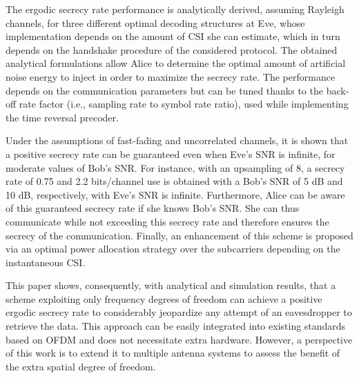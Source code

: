 \documentclass[journal,comsoc]{IEEEtran}
\begin{document}
The ergodic secrecy rate performance is analytically derived, assuming Rayleigh channels, for three different optimal decoding structures at Eve, whose implementation depends on the amount of CSI she can estimate, which in turn depends on the handshake procedure of the considered protocol. The obtained analytical formulations allow Alice to determine the optimal amount of artificial noise energy to inject in order to maximize the secrecy rate. The performance depends on the communication parameters but can be tuned thanks to the back-off rate factor (i.e., sampling rate to symbol rate ratio), used while implementing the time reversal precoder.


Under the assumptions of fast-fading and uncorrelated channels, it is shown that a positive secrecy rate can be guaranteed even when Eve’s SNR is infinite, for moderate values of Bob’s SNR. For instance, with an upsampling of 8, a secrecy rate of 0.75 and 2.2 bits/channel use is obtained with a Bob’s SNR of 5 dB and 10 dB, respectively, with Eve’s SNR is infinite. Furthermore, Alice can be aware of this guaranteed secrecy rate if she knows Bob’s SNR. She can thus communicate while not exceeding this secrecy rate and therefore ensures the secrecy of the communication. Finally, an enhancement of this scheme is proposed via an optimal power allocation strategy over the subcarriers depending on the instantaneous CSI.


This paper shows, consequently, with analytical and simulation results, that a scheme exploiting only frequency degrees of freedom can achieve a positive ergodic secrecy rate to considerably jeopardize any attempt of an eavesdropper to retrieve the data. This approach can be easily integrated into existing standards based on OFDM and does not necessitate extra hardware. However, a perspective of this work is to extend it to multiple antenna systems to assess the benefit of the extra spatial degree of freedom.




%
%
\end{document}
